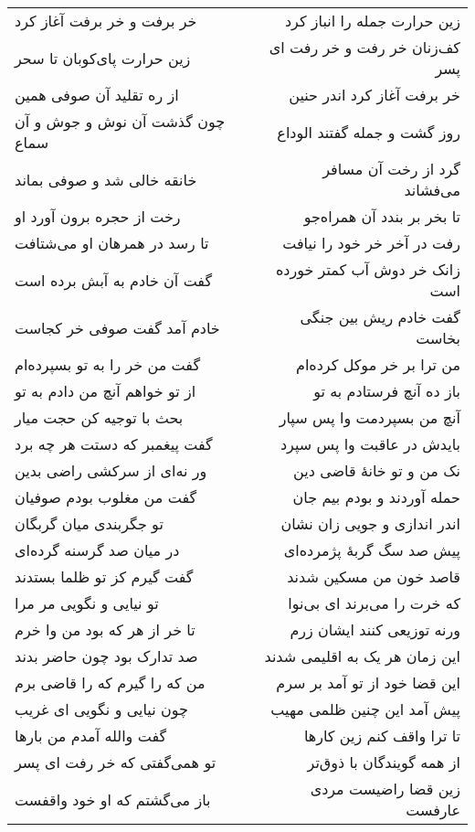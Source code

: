 \begin{center}
\begin{longtable}{l p{0.5cm} r}
خر برفت و خر برفت آغاز کرد
&&
زین حرارت جمله را انباز کرد
\\
زین حرارت پای‌کوبان تا سحر
&&
کف‌زنان خر رفت و خر رفت ای پسر
\\
از ره تقلید آن صوفی همین
&&
خر برفت آغاز کرد اندر حنین
\\
چون گذشت آن نوش و جوش و آن سماع
&&
روز گشت و جمله گفتند الوداع
\\
خانقه خالی شد و صوفی بماند
&&
گرد از رخت آن مسافر می‌فشاند
\\
رخت از حجره برون آورد او
&&
تا بخر بر بندد آن همراه‌جو
\\
تا رسد در همرهان او می‌شتافت
&&
رفت در آخر خر خود را نیافت
\\
گفت آن خادم به آبش برده است
&&
زانک خر دوش آب کمتر خورده است
\\
خادم آمد گفت صوفی خر کجاست
&&
گفت خادم ریش بین جنگی بخاست
\\
گفت من خر را به تو بسپرده‌ام
&&
من ترا بر خر موکل کرده‌ام
\\
از تو خواهم آنچ من دادم به تو
&&
باز ده آنچ فرستادم به تو
\\
بحث با توجیه کن حجت میار
&&
آنچ من بسپردمت وا پس سپار
\\
گفت پیغمبر که دستت هر چه برد
&&
بایدش در عاقبت وا پس سپرد
\\
ور نه‌ای از سرکشی راضی بدین
&&
نک من و تو خانهٔ قاضی دین
\\
گفت من مغلوب بودم صوفیان
&&
حمله آوردند و بودم بیم جان
\\
تو جگربندی میان گربگان
&&
اندر اندازی و جویی زان نشان
\\
در میان صد گرسنه گرده‌ای
&&
پیش صد سگ گربهٔ پژمرده‌ای
\\
گفت گیرم کز تو ظلما بستدند
&&
قاصد خون من مسکین شدند
\\
تو نیایی و نگویی مر مرا
&&
که خرت را می‌برند ای بی‌نوا
\\
تا خر از هر که بود من وا خرم
&&
ورنه توزیعی کنند ایشان زرم
\\
صد تدارک بود چون حاضر بدند
&&
این زمان هر یک به اقلیمی شدند
\\
من که را گیرم که را قاضی برم
&&
این قضا خود از تو آمد بر سرم
\\
چون نیایی و نگویی ای غریب
&&
پیش آمد این چنین ظلمی مهیب
\\
گفت والله آمدم من بارها
&&
تا ترا واقف کنم زین کارها
\\
تو همی‌گفتی که خر رفت ای پسر
&&
از همه گویندگان با ذوق‌تر
\\
باز می‌گشتم که او خود واقفست
&&
زین قضا راضیست مردی عارفست
\\

\end{longtable}
\end{center}
